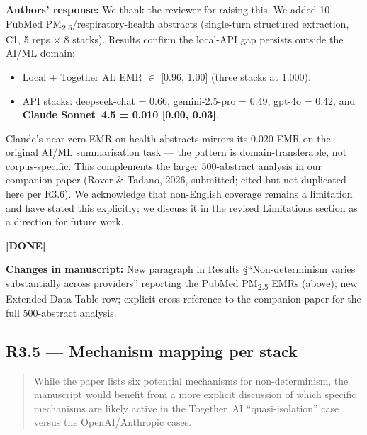 \documentclass[11pt,a4paper]{article}
\newenvironment{revquote}{%
  \begin{quote}\small\itshape\color{revgray}
}{%
  \end{quote}
}
\newcommand{\response}[1]{\par\noindent\textbf{\color{revgreen}Authors' response:} #1\par}
\newcommand{\changes}[1]{\par\noindent\textbf{\color{revblue}Changes in manuscript:} #1\par}
\newcommand{\done}{\color{revgreen}\textbf{[DONE]}}
\begin{document}
\response{We thank the reviewer for raising this. We added 10 PubMed PM\textsubscript{2.5}/respiratory-health abstracts (single-turn structured extraction, C1, 5 reps $\times$ 8 stacks). Results confirm the local-API gap persists outside the AI/ML domain:

\begin{itemize}[leftmargin=*]
  \item Local + Together AI: EMR $\in$ [0.96, 1.00] (three stacks at 1.000).
  \item API stacks: deepseek-chat = 0.66, gemini-2.5-pro = 0.49, gpt-4o = 0.42, and \textbf{Claude Sonnet~4.5 = 0.010 [0.00, 0.03]}.
\end{itemize}

Claude's near-zero EMR on health abstracts mirrors its 0.020 EMR on the original AI/ML summarisation task --- the pattern is domain-transferable, not corpus-specific. This complements the larger 500-abstract analysis in our companion paper (Rover \& Tadano, 2026, submitted; cited but not duplicated here per R3.6). We acknowledge that non-English coverage remains a limitation and have stated this explicitly; we discuss it in the revised Limitations section as a direction for future work.} \done

\changes{New paragraph in Results §``Non-determinism varies substantially across providers'' reporting the PubMed PM\textsubscript{2.5} EMRs (above); new Extended Data Table row; explicit cross-reference to the companion paper for the full 500-abstract analysis.}

\subsection*{R3.5 --- Mechanism mapping per stack}

\begin{revquote}
While the paper lists six potential mechanisms for non-determinism, the manuscript would benefit from a more explicit discussion of which specific mechanisms are likely active in the Together~AI ``quasi-isolation'' case versus the OpenAI/Anthropic cases.
\end{revquote}
\end{document}
